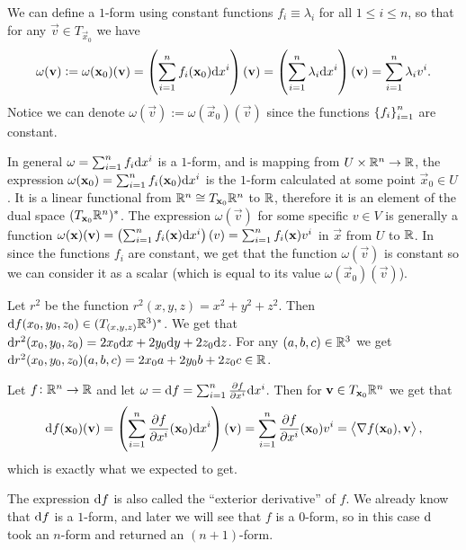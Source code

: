 \documentclass[11pt,a4paper]{article}
\begin{document}
\begin{example}
  \label{exmp:constant-one-form}
  We can define a $1$-form using constant functions $f_i \equiv \lambda_i$
  for all $1 \le i \le n$,
  so that for any $\vec v \in T_{\vec x_0}$ we have
  \[
    \omega(\vec v) :=
    \omega(\vec x_0)(\vec v) =
    \del{\sum_{i=1}^{n} f_i(\vec x_0) \dx^i}(\vec v) =
    \del{\sum_{i=1}^{n} \lambda_i \dx^i}(\vec v) =
    \sum_{i=1}^{n} \lambda_i v^i.
  \]
  Notice we can denote $\omega(\vec v) := \omega(\vec x_0)(\vec v)$
  since the functions $\left\{f_i\right\}_{i=1}^{n}$ are constant.
\end{example}

\begin{remark}
  In general
  $\omega = \sum_{i=1}^{n} f_i \dx^i$
  is a $1$-form, and is mapping from $U \times \mathbb{R}^n \to \mathbb{R}$,
  the expression
  $\omega(\vec x_0) = \sum_{i=1}^{n} f_i(\vec x_0) \dx^i$
  is the $1$-form calculated at some point $\vec x_0 \in U$.
  It is a linear functional from $\mathbb{R}^n \cong T_{\boldsymbol{\mathbf{x}}_0} \mathbb{R}^n$ to $\mathbb{R}$,
  therefore it is an element of the dual space $(T_{\boldsymbol{\mathbf{x}}_0} \mathbb{R}^n)^*$.
  The expression $\omega(\vec v)$
  for some specific $v \in V$ is generally
  a function $\omega(\vec x)(\vec v) =
  \del{\sum_{i=1}^{n} f_i(\vec x) \dx^i}(v) =
  \sum_{i=1}^{n} f_i(\vec x) v^i$ in $\vec x$ from $U$ to $\mathbb{R}$.
  In  since the functions $f_i$
  are constant, we get that the function $\omega(\vec v)$
  is constant so we can consider it as a scalar (which is equal
  to its value $\omega(\vec x_0)(\vec v)$).
\end{remark}

\begin{example}
  Let $r^2$ be the function $r^2(x,y,z) = x^2 + y^2 + z^2$.
  Then $\mathrm{d} f(x_0,y_0,z_0) \in (T_{(x,y,z)} \mathbb{R}^3)^*$.
  We get that $\dif r^2(x_0,y_0,z_0) = 2x_0 \dx + 2y_0 \dy + 2z_0 \dz$.
  For any $(a,b,c) \in \mathbb{R}^3$
  we get $\mathrm{d} r^2(x_0,y_0,z_0)(a,b,c) = 2x_0 a + 2y_0 b + 2z_0 c \in \mathbb{R}$.
\end{example}

\begin{example}
  Let $f \colon \mathbb{R}^n \to \mathbb{R}$ and let $\omega = \dif f =
  \sum_{i=1}^{n} \frac{\partial f}{\partial x^i} \dx^i$.
  Then for $\boldsymbol{\mathbf{v}} \in T_{\boldsymbol{\mathbf{x}}_0} \mathbb{R}^n$ we get that
  \[
    \dif f(\vec x_0)(\vec v) =
    \del{\sum_{i=1}^{n} \frac{\partial f}{\partial x^i}(\vec x_0) \dx^i}(\vec v) =
    \sum_{i=1}^{n} \frac{\partial f}{\partial x^i}(\vec x_0) v^i =
    \ip{\nabla f(\vec x_0)}{\vec v},
  \]
  which is exactly what we expected to get.
\end{example}
\begin{remark}
  \label{rmk:exterior-derivative-of-zero-form}
  The expression $\mathrm{d} f$ is also called the ``exterior derivative''
  of $f$.
  We already know that $\mathrm{d} f$ is a $1$-form,
  and later we will see that $f$ is a $0$-form,
  so in this case $\mathrm{d}$ took an $n$-form and returned an $(n+1)$-form.
\end{remark}
\end{document}
